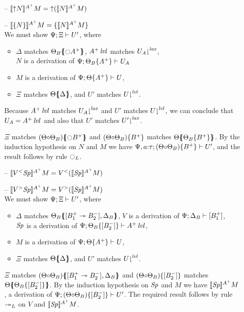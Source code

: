 \begin{itemize}
\item[--] $\lsubsta{\tupl{N}}{M}{A^+} = \tupl{(\lsubsta{N}{M}{A^+})}$
\item[--] $\lsubsta{\tlaxl{N}}{M}{A^+} = \tlaxl{\lsubsta{N}{M}{A^+}}$\smallskip\\
  We must show $\foc{\Psi}{\Xi}{U'}$, where
  \begin{itemize}
  \item $\Delta$ matches $\frameoff{\Theta_B}{{\ocircle}A^+}$, 
     $\islvl{A^+}$ matches $\restrictfrom{U_A}{\mlax}$,\\
     $N$ is a derivation of $\foc{\Psi}{\tackon{\Theta_B}{A^+}}{U_A}$
  \item $M$ is a derivation of $\foc{\Psi}{\tackon{\Theta}{A^+}}{U}$,
  \item $\Xi$ matches $\frameoff{\Theta}{\Delta}$, and $U'$ matches 
     $\restrictfrom{U}{\mlvl}$.
  \end{itemize}
  Because $\islvl{A^+}$ matches $\restrictfrom{U_A}{\mlax}$
  and $U'$ matches $\restrictfrom{U}{\mlvl}$, 
  we can conclude that $U_A = \islvl{A^+}$ and also that $U'$ matches 
  $\restrictfrom{U'}{\mlax}$. 

  $\Xi$ matches $\frameoff{(\Theta{\circ}\Theta_B)}{{\ocircle}B^+}$
  and $\tackon{(\Theta{\circ}\Theta_B)}{B^+}$ matches 
  $\frameoff{\Theta}{\tackon{\Theta_B}{B^+}}$.
  By the induction hypothesis on $N$ and $M$ we have
  $\foc{\Psi, a{:}\tau}{\tackon{(\Theta{\circ}\Theta_B)}{B^+}}{U'}$,
  and the result follows by rule ${\ocircle}_L$.  \smallskip

\item[--] $\lsubsta{\tappl{V}{\Sp}}{M}{A^+} 
           = \tappl{V}{(\lsubsta{\Sp}{M}{A^+})}$
\item[--] $\lsubsta{\tappr{V}{\Sp}}{M}{A^+} 
           = \tappr{V}{(\lsubsta{\Sp}{M}{A^+})}$\smallskip\\
  We must show $\foc{\Psi}{\Xi}{U'}$, where
  \begin{itemize}
  \item $\Delta$ matches 
     $\frameoff{\Theta_B}{\matchconj{[B_1^+ \righti B_2^-]}{\Delta_B}}$,
     $V$ is a derivation of $\foc{\Psi}{\Delta_B}{[B_1^+]}$, \\
     $\Sp$ is a derivation of 
     $\foc{\Psi}{\tackon{\Theta_B}{[B_2^-]}}{\islvl{A^+}}$,
  \item $M$ is a derivation of $\foc{\Psi}{\tackon{\Theta}{A^+}}{U}$,
  \item $\Xi$ matches $\frameoff{\Theta}{\Delta}$, and $U'$ matches 
     $\restrictfrom{U}{\mlvl}$.
  \end{itemize}
  $\Xi$ matches 
  $\frameoff{(\Theta{\circ}\Theta_B)}
    {\matchconj{[B_1^+ \righti B_2^-]}{\Delta_B}}$
  and $\tackon{(\Theta{\circ}\Theta_B)}{[B_2^-]}$ matches 
  $\frameoff{\Theta}{\tackon{\Theta_B}{[B_2^-]}}$.
  By the induction hypothesis on $\Sp$ and $M$ we have
  $\lsubsta{\Sp}{M}{A^+}$, a derivation of
  $\foc{\Psi}{\tackon{(\Theta{\circ}\Theta_B)}{[B_2^-]}}{U'}$.
  The required result follows by rule ${\righti}_L$ on $V$ and 
  $\lsubsta{\Sp}{M}{A^+}$.  \smallskip


\end{itemize}
